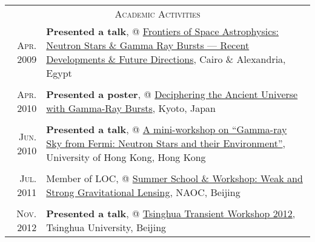 \documentclass[10pt]{article}
\begin{document}
\vspace{-2.5em}

\begin{longtable}{r|p{16.5cm}}
\multicolumn{2}{c}{\textsc{Academic Activities}}  \\
\textsc{Apr. 2009}   &   \textbf{Presented a talk}, @ \href{http://www.ns-grb.com/index0.html}{Frontiers of Space Astrophysics: Neutron Stars \& Gamma Ray Bursts --- Recent Developments \& Future Directions}, Cairo \& Alexandria, Egypt     \\
\multicolumn{2}{c}{} \\
\textsc{Apr. 2010}   &   \textbf{Presented a poster}, @ \href{http://www-tap.scphys.kyoto-u.ac.jp/GRB2010/}{Deciphering the Ancient Universe with Gamma-Ray Bursts}, Kyoto, Japan    \\
\multicolumn{2}{c}{} \\
\textsc{Jun. 2010}   &   \textbf{Presented a talk}, @ \href{http://www.physics.hku.hk/~astro/2010Astro/Index.htm}{A mini-workshop on ``Gamma-ray Sky from Fermi: Neutron Stars and their Environment''}, University of Hong Kong, Hong Kong   \\
\multicolumn{2}{c}{} \\
\textsc{Jul. 2011}   &   Member of LOC, @ \href{http://lss.bao.ac.cn/meeting/lens11/}{Summer School \& Workshop: Weak and Strong Gravitational Lensing}, NAOC, Beijing  \\
\multicolumn{2}{c}{} \\
\textsc{Nov. 2012}   &   \textbf{Presented a talk}, @ \href{http://www.thca.tsinghua.edu.cn/en/index.php/Workshop_programme}{Tsinghua Transient Workshop 2012}, Tsinghua University, Beijing   \\
\end{longtable}
\end{document}
